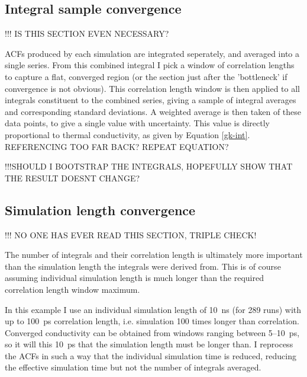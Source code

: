 \pagebreak

\subsection{\label{sec:3.GK.int}Integral sample convergence}

!!! IS THIS SECTION EVEN NECESSARY? 

ACFs produced by each simulation are integrated seperately, and averaged into a single series. 
From this combined integral I pick a window of correlation lengths to capture a flat, converged region (or the section just after the 'bottleneck' if convergence is not obvious). This correlation length window is then applied to all integrals constituent to the combined series, giving a sample of integral averages and corresponding standard deviations. A weighted average is then taken of these data points, to give a single value with uncertainty. This value is directly proportional to thermal conductivity, as given by Equation \ref{gk-int}. REFERENCING TOO FAR BACK? REPEAT EQUATION?

!!!SHOULD I BOOTSTRAP THE INTEGRALS, HOPEFULLY SHOW THAT THE RESULT DOESNT CHANGE?
\pagebreak
\subsection{\label{sec:3.GK.sim}Simulation length convergence}




!!! NO ONE HAS EVER READ THIS SECTION, TRIPLE CHECK!

The number of integrals and their correlation length is ultimately more important than the simulation length the integrals were derived from. This is of course assuming individual simulation length is much longer than the required correlation length window maximum. 

In this example I use an individual simulation length of 10~ns (for 289 runs) with up to 100~ps correlation length, i.e. simulation 100 times longer than correlation. Converged conductivity can be obtained from windows ranging between 5--10~ps, so it will this 10~ps that the simulation length must be longer than. I reprocess the ACFs in such a way that the individual simulation time is reduced, reducing the effective simulation time but not the number of integrals averaged.

